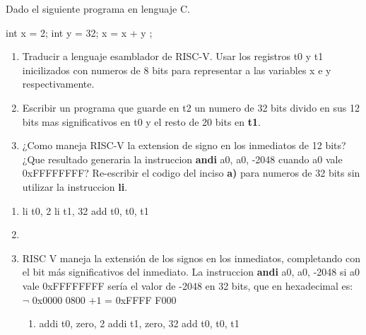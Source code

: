 \begin{enunciado}{\ejercicio}
    Dado el siguiente programa en lenguaje C.

    \begin{center}
    \begin{cLang}[linewidth=6cm]
    int x = 2;
    int y = 32;
    x = x + y ;
    \end{cLang}
\end{center}
    
    \begin{enumerate}
        \item Traducir a lenguaje esamblador de RISC-V. Usar los registros t0 y t1 inicilizados con
numeros de 8 bits para representar a las variables x e y respectivamente.
        \item  Escribir un programa que guarde en t2 un numero de 32 bits divido en sus 12 bits mas
        significativos en t0 y el resto de 20 bits en \textbf{t1}.
        \item ¿Como maneja RISC-V la extension de signo en los inmediatos de 12 bits? ¿Que resultado 
        generaria la instruccion  \textbf{andi} a0, a0, -2048 cuando a0 vale 0xFFFFFFFF? Re-escribir
        el codigo del inciso  \textbf{a)} para numeros de 32 bits sin utilizar la instruccion  \textbf{li}.
    \end{enumerate}
    \end{enunciado}

    \begin{enumerate}
        \item 
        \begin{riscv}
    li t0, 2
    li t1, 32
    add t0, t0, t1
        \end{riscv}
        \item \hacer
        \item RISC V maneja la extensión de los signos en los inmediatos, completando con el bit más significativos
        del inmediato. 
        La instruccion \textbf{andi} a0, a0, -2048 si a0 vale 0xFFFFFFFF sería el valor de -2048 en 32 bits, que  en 
        hexadecimal es:  $\neg$ 0x0000 0800 $+ 1$ = 0xFFFF F000 

        \begin{enumerate}
            \item 
                \begin{riscv}
    addi t0, zero, 2
    addi t1, zero, 32
    add t0, t0, t1
                \end{riscv}
        \end{enumerate}
    \end{enumerate}
    